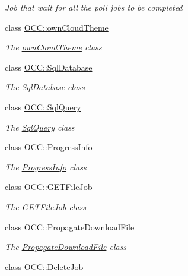 \begin{DoxyCompactItemize}
\begin{DoxyCompactList}\small\item\em Job that wait for all the poll jobs to be completed \end{DoxyCompactList}\item 
class \hyperlink{class_o_c_c_1_1own_cloud_theme}{O\+C\+C\+::own\+Cloud\+Theme}
\begin{DoxyCompactList}\small\item\em The \hyperlink{class_o_c_c_1_1own_cloud_theme}{own\+Cloud\+Theme} class \end{DoxyCompactList}\item 
class \hyperlink{class_o_c_c_1_1_sql_database}{O\+C\+C\+::\+Sql\+Database}
\begin{DoxyCompactList}\small\item\em The \hyperlink{class_o_c_c_1_1_sql_database}{Sql\+Database} class \end{DoxyCompactList}\item 
class \hyperlink{class_o_c_c_1_1_sql_query}{O\+C\+C\+::\+Sql\+Query}
\begin{DoxyCompactList}\small\item\em The \hyperlink{class_o_c_c_1_1_sql_query}{Sql\+Query} class \end{DoxyCompactList}\item 
class \hyperlink{class_o_c_c_1_1_progress_info}{O\+C\+C\+::\+Progress\+Info}
\begin{DoxyCompactList}\small\item\em The \hyperlink{class_o_c_c_1_1_progress_info}{Progress\+Info} class \end{DoxyCompactList}\item 
class \hyperlink{class_o_c_c_1_1_g_e_t_file_job}{O\+C\+C\+::\+G\+E\+T\+File\+Job}
\begin{DoxyCompactList}\small\item\em The \hyperlink{class_o_c_c_1_1_g_e_t_file_job}{G\+E\+T\+File\+Job} class \end{DoxyCompactList}\item 
class \hyperlink{class_o_c_c_1_1_propagate_download_file}{O\+C\+C\+::\+Propagate\+Download\+File}
\begin{DoxyCompactList}\small\item\em The \hyperlink{class_o_c_c_1_1_propagate_download_file}{Propagate\+Download\+File} class \end{DoxyCompactList}\item 
class \hyperlink{class_o_c_c_1_1_delete_job}{O\+C\+C\+::\+Delete\+Job}

\end{DoxyCompactItemize}
